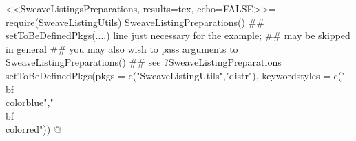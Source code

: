\RequirePackage{fancyvrb}
\RequirePackage{listings}
%
<<SweaveListingsPreparations, results=tex, echo=FALSE>>=
require(SweaveListingUtils)
SweaveListingPreparations()
## setToBeDefinedPkgs(....) line just necessary for the example;
##    may be skipped in general  
##    you may also wish to pass arguments to SweaveListingPreparations()
##    see ?SweaveListingPreparations
setToBeDefinedPkgs(pkgs = c("SweaveListingUtils","distr"),
                   keywordstyles = c("\\bf\\color{blue}","\\bf\\color{red}"))
@
